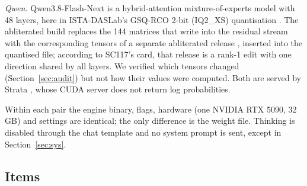 \documentclass[11pt,a4paper]{article}
\begin{document}
\emph{Qwen.} Qwen3.8-Flash-Next is a hybrid-attention mixture-of-experts model with 48 layers, here in ISTA-DASLab's
GSQ-RCO 2-bit (IQ2\_XS) quantisation \citep{ista2026gsq}. The abliterated build \citep{sc117abliterated} replaces the
144 matrices that write into the residual stream with the corresponding tensors of a separate abliterated release
\citep{orcarouter2026}, inserted into the quantised file; according to SC117's card, that release is a rank-1 edit
with one direction shared by all layers. We verified which tensors changed (Section~\ref{sec:audit}) but not how their values were
computed. Both are served by Strata
\citep{strata}, whose CUDA server does not return log probabilities.

Within each pair the engine binary, flags, hardware (one NVIDIA RTX 5090, 32\,GB) and settings are identical; the only
difference is the weight file. Thinking is disabled through the chat template and no system prompt is sent, except in
Section~\ref{sec:sys}.

\begin{table}[t]
\centering\small
\caption{Model pairs. ``Changed'' is the number of tensors whose bytes differ from the original
(Section~\ref{sec:audit}).}
\label{tab:models}
\end{table}

\subsection{Items}\label{sec:items}
\end{document}
